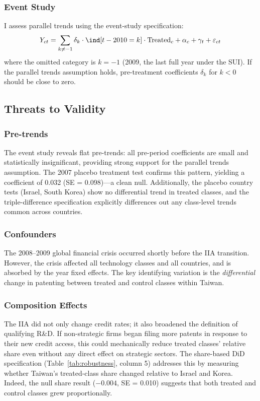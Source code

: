 \documentclass[12pt]{article}
\begin{document}
\subsubsection*{Event Study} I assess parallel trends using the event-study specification:
\begin{equation}
Y_{ct} = \sum_{k \neq -1} \delta_k \cdot \ind[t - 2010 = k] \cdot \text{Treated}_c + \alpha_c + \gamma_t + \varepsilon_{ct}
\end{equation}
where the omitted category is $k = -1$ (2009, the last full year under the SUI). If the parallel trends assumption holds, pre-treatment coefficients $\delta_k$ for $k < 0$ should be close to zero.

\subsection{Threats to Validity}

\subsubsection*{Pre-trends} The event study reveals flat pre-trends: all pre-period coefficients are small and statistically insignificant, providing strong support for the parallel trends assumption. The 2007 placebo treatment test confirms this pattern, yielding a coefficient of 0.032 (SE = 0.098)---a clean null. Additionally, the placebo country tests (Israel, South Korea) show no differential trend in treated classes, and the triple-difference specification explicitly differences out any class-level trends common across countries.

\subsubsection*{Confounders} The 2008--2009 global financial crisis occurred shortly before the IIA transition. However, the crisis affected all technology classes and all countries, and is absorbed by the year fixed effects. The key identifying variation is the \textit{differential} change in patenting between treated and control classes within Taiwan.

\subsubsection*{Composition Effects} The IIA did not only change credit rates; it also broadened the definition of qualifying R\&D. If non-strategic firms began filing more patents in response to their new credit access, this could mechanically reduce treated classes' relative share even without any direct effect on strategic sectors. The share-based DiD specification (Table~\ref{tab:robustness}, column 5) addresses this by measuring whether Taiwan's treated-class share changed relative to Israel and Korea. Indeed, the null share result ($-0.004$, SE = 0.010) suggests that both treated and control classes grew proportionally.
\end{document}
